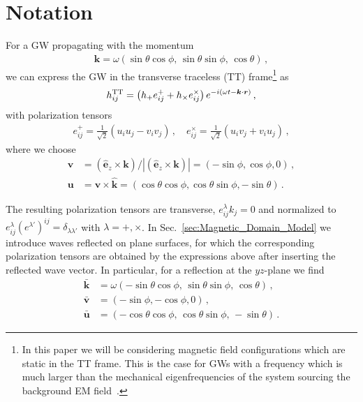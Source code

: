 \documentclass[a4paper,11pt]{article}
\begin{document}
\appendix

\section{Notation}
\label{app:notation}


For a GW propagating with the momentum
%
\begin{align}
   \bm{k} = \omega \left( \sin \theta \cos \phi, \,
   \sin \theta \sin \phi, \,
   \cos \theta \right) \, ,
\end{align}
%
we can express the GW in the transverse traceless (TT) frame\footnote{In this paper we will be considering magnetic field configurations which are static in the TT frame. This is the case for GWs with a frequency which is much larger than the mechanical eigenfrequencies of the system sourcing the background EM field~\cite{Ratzinger:2024spd}.} as
\begin{align}
    h^{\rm TT}_{ij} = \left(  h_{+}  e_{ij}^{+}+ h_{\times}  e_{ij}^{\times} \right) e^{-i (\omega t -  \bm k \cdot {\bm r}) } \,,
    \label{eq:app_h}
\end{align}
%
with polarization tensors
%
\begin{align}
   e_{ij}^{+} =   \frac{1}{\sqrt{2}}  ( u_{i} u_{j} - v_{i} v_{j} ) \,, \quad  e_{ij}^{\times} = \frac{1}{\sqrt{2}}  ( u_{i} v_{j} + v_{i} u_{j} ) \,,
\end{align}
%
where we choose
%
\begin{equation}
    \begin{aligned}
    \label{eq:uv}
        \bm{v} & =  %
                    (\hat{\bm e}_z \times \bm k)/| (\hat{\bm e}_z \times \bm k) |  = (-\sin \phi , \cos \phi , 0 ) \,, \\
        \bm{u} & =  \bm{v}  \times \hat{\bm k} = (\cos \theta \cos \phi , \cos \theta \sin \phi , - \sin \theta ) \,.
    \end{aligned}
\end{equation}
%

The resulting polarization tensors are transverse, $e^\lambda_{ij}k_j = 0$ and normalized to $e^\lambda_{ij} (e^{\lambda'})^{ij} = \delta_{\lambda \lambda'}$ with $\lambda = +,\times$.
In Sec.~\ref{sec:Magnetic_Domain_Model} we introduce waves reflected on plane surfaces, for which the corresponding polarization tensors are obtained by the expressions above after inserting the reflected wave vector.
%
In particular, for a reflection at the $yz$-plane we find
\begin{equation}
    \begin{aligned}
     \bar{\bm k} & = \omega \left(- \sin \theta \cos \phi, \, \sin \theta \sin \phi, \, \cos \theta \right) \,, \\
     \bar{\bm v} & = (-\sin \phi , -\cos \phi , 0 ) \,, \\
     \bar{\bm u}&  = (- \cos \theta \cos \phi, \, \cos \theta \sin \phi, \, - \sin \theta )\,.
    \end{aligned}
\end{equation}
\end{document}

